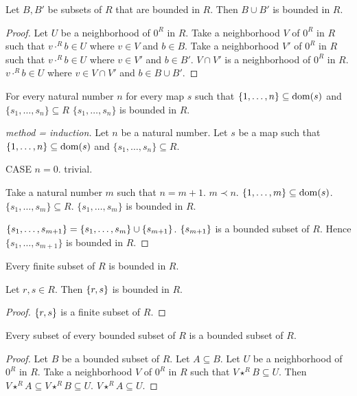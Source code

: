 \documentclass[english,11pt]{article}
\newcommand{\Seq}[2]{\{#1,\dots,#2\}}
\newcommand{\FinSet}[3]{\{#1_{#2},\dots,#1_{#3}\}}
\begin{document}
\begin{forthel}
\begin{lemma}
Let $B,B'$ be subsets of $R$ that are bounded in $R$.
Then $B \cup B'$ is bounded in $R$.
\end{lemma}
\begin{proof}
Let $U$ be a neighborhood of $0^{R}$ in $R$.
Take a neighborhood $V$ of $0^{R}$ in $R$ such that
$v \cdot^{R} b \in U$ where $v \in V$ and $b \in B$.
Take a neighborhood $V'$ of $0^{R}$ in $R$ such that
$v \cdot^{R} b \in U$ where $v \in V'$ and $b \in B'$.
$V \cap V'$ is a neighborhood of $0^{R}$ in $R$.
$v \cdot^{R} b \in U$ where $v \in V \cap V'$ and 
$b \in B \cup B'$.
\end{proof}

\begin{lemma} For every natural number $n$
for every map $s$ such that 
$\Seq{1}{n} \subseteq \dom(s)$ and $\FinSet{s}{1}{n} \subseteq R$
$\FinSet{s}{1}{n}$ is bounded in $R$.
\end{lemma}
\begin{proof}[method = induction]
Let $n$ be a natural number.
Let $s$ be a map such that 
$\Seq{1}{n} \subseteq \dom(s)$ and $\FinSet{s}{1}{n} \subseteq R$.

CASE $n = 0$. trivial.

Take a natural number $m$ such that $n = m +1$. $m \prec n$.
$\Seq{1}{m} \subseteq \dom(s)$. $\FinSet{s}{1}{m} \subseteq R$.
$\FinSet{s}{1}{m}$ is bounded in $R$.

$\FinSet{s}{1}{m+1} = \FinSet{s}{1}{m} \cup \sing{s_{m+1}}$.
$\{s_{m+1}\}$ is a bounded subset of $R$.
Hence $\FinSet{s}{1}{m+1}$ is bounded in $R$.
\end{proof}

\begin{lemma}[title = 5 28 1]
Every finite subset of $R$ is bounded in $R$.
\end{lemma}

\begin{lemma}
Let $r,s \in R$. Then $\{r,s\}$ is bounded in $R$.
\end{lemma}
\begin{proof}
$\{r,s\}$ is a finite subset of $R$.
\end{proof}

\begin{lemma}[title = L 136]
Every subset of every bounded subset of $R$ is a bounded subset of $R$.
\end{lemma}
\begin{proof}
Let $B$ be a bounded subset of $R$.
Let $A \subseteq B$.
Let $U$ be a neighborhood of $0^{R}$ in $R$.
Take a neighborhood $V$ of $0^{R}$ in $R$ such that $V \star^{R} B \subseteq U$.
Then $V \star^{R} A \subseteq V \star^{R} B \subseteq U$.
$V \star^{R} A \subseteq U$.
\end{proof}
\end{forthel}
\end{document}

